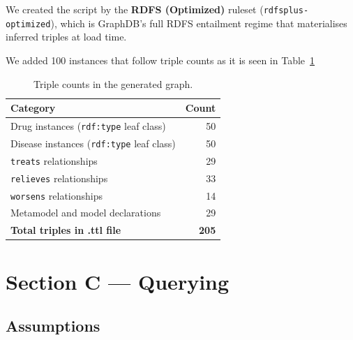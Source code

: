 \documentclass[11pt,a4paper]{article}
\begin{document}
We created the script by  the \textbf{RDFS (Optimized)} ruleset
(\texttt{rdfsplus-optimized}), which is GraphDB's full RDFS entailment regime
that materialises inferred triples at load time.

We added 100 instances that follow triple counts as it is seen in Table~\ref{tab:counts}
\begin{table}[h!]
\centering
\caption{Triple counts in the generated graph.}
\label{tab:counts}
\begin{tabular}{@{}lr@{}}
\toprule
\textbf{Category} & \textbf{Count} \\
\midrule
Drug instances (\texttt{rdf:type} leaf class)    & 50 \\
Disease instances (\texttt{rdf:type} leaf class) & 50 \\
\texttt{treats} relationships                    & 29 \\
\texttt{relieves} relationships                  & 33 \\
\texttt{worsens} relationships                   & 14 \\
Metamodel and model declarations                 & 29 \\
\midrule
\textbf{Total triples in .ttl file}              & \textbf{205} \\
\bottomrule
\end{tabular}
\end{table}

\section{Section C — Querying}

\subsection{Assumptions}
\end{document}
